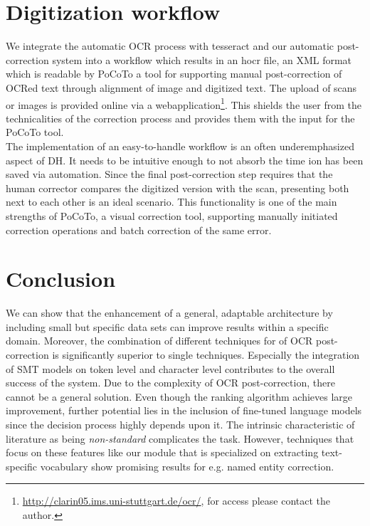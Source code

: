 \documentclass[11pt,letterpaper]{article}
\begin{document}
\section{Digitization workflow}\label{sec:workflow}
We integrate the automatic OCR process with tesseract and our automatic post-correction system into a workflow which results in an hocr file, an XML format which is readable by PoCoTo \cite{Vobl2014} a tool for supporting manual post-correction of OCRed text through alignment of image and digitized text. The upload of scans or images is provided online via a webapplication\footnote{\url{http://clarin05.ims.uni-stuttgart.de/ocr/}, for access please contact the author.}. This shields the user from the technicalities of the correction process and provides them with the input for the PoCoTo tool.\\
The implementation of an easy-to-handle workflow is an often underemphasized aspect of DH. It needs 
to be intuitive enough to not absorb the time ion has been saved via automation. 
Since the final post-correction step requires that the human corrector compares the digitized version with the scan, presenting both next to each other is an ideal scenario.  This functionality is one of the main strengths of PoCoTo, a visual correction tool, supporting manually initiated correction operations and batch correction of the same error. 



\section{Conclusion}
We can show that the enhancement of a general, adaptable architecture by including small but specific data sets
can improve results within a specific domain. Moreover, the combination of different 
techniques for of OCR post-correction is significantly superior to single techniques. Especially the integration of SMT models on token level and character level contributes to the overall success of the system.
Due to the complexity of OCR post-correction, there cannot be a general solution. 
Even though the ranking algorithm achieves large improvement, further potential lies in
the inclusion of fine-tuned language models since the decision process highly depends 
upon it.
The intrinsic characteristic of literature as being \textit{non-standard} complicates the task. However, techniques that focus on these features like our module that is specialized on extracting text-specific vocabulary show promising results for e.g. named entity correction.
\end{document}

